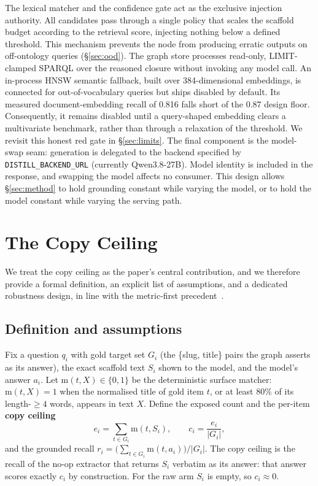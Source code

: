 \documentclass[10pt,twocolumn]{article}
\begin{document}
The lexical matcher and the confidence gate act as the exclusive injection authority. All candidates pass through a single policy that scales the scaffold budget according to the retrieval score, injecting nothing below a defined threshold. This mechanism prevents the node from producing erratic outputs on off-ontology queries (\S\ref{sec:ood}). The graph store processes read-only, LIMIT-clamped SPARQL over the reasoned closure without invoking any model call. An in-process HNSW semantic fallback, built over 384-dimensional embeddings, is connected for out-of-vocabulary queries but ships disabled by default. Its measured document-embedding recall of 0.816 falls short of the 0.87 design floor. Consequently, it remains disabled until a query-shaped embedding clears a multivariate benchmark, rather than through a relaxation of the threshold. We revisit this honest red gate in \S\ref{sec:limits}. The final component is the model-swap seam: generation is delegated to the backend specified by \texttt{DISTILL\_BACKEND\_URL} (currently Qwen3.8-27B). Model identity is included in the response, and swapping the model affects no consumer. This design allows \S\ref{sec:method} to hold grounding constant while varying the model, or to hold the model constant while varying the serving path.

\section{The Copy Ceiling}\label{sec:ceiling}
We treat the copy ceiling as the paper's central contribution, and we therefore provide a formal definition, an explicit list of assumptions, and a dedicated robustness design, in line with the metric-first precedent~\cite{min2023factscore,gao2023alce}.

\subsection{Definition and assumptions}
Fix a question $q_i$ with gold target set $G_i$ (the \{slug, title\} pairs the graph asserts as its
answer), the exact scaffold text $S_i$ shown to the model, and the model's answer $a_i$. Let
$\mathrm{m}(t,X)\in\{0,1\}$ be the deterministic surface matcher: $\mathrm{m}(t,X)=1$ when the
normalised title of gold item $t$, or at least $80\%$ of its length-$\geq4$ words, appears in text
$X$. Define the exposed count and the per-item \textbf{copy ceiling}
\[
  e_i=\sum_{t\in G_i}\mathrm{m}(t,S_i),\qquad
  c_i=\frac{e_i}{|G_i|},
\]
and the grounded recall $r_i=\bigl(\sum_{t\in G_i}\mathrm{m}(t,a_i)\bigr)/|G_i|$. The copy ceiling
is the recall of the no-op extractor that returns $S_i$ verbatim as its answer: that answer scores
exactly $c_i$ by construction. For the raw arm $S_i$ is empty, so $c_i\approx0$.
\end{document}
